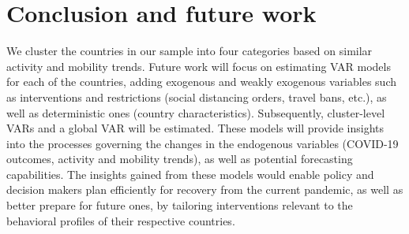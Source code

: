 \documentclass[titlepage,oneside,12pt]{article}
\newcommand{\?}{\stackrel{?}{=}}
\begin{document}
\section{Conclusion and future work}
We cluster the countries in our sample into four categories based on similar activity and mobility trends.
Future work will focus on estimating VAR models for each of the countries, adding exogenous and weakly exogenous variables such as interventions and restrictions (social distancing orders, travel bans, etc.), as well as deterministic ones (country characteristics).
Subsequently, cluster-level VARs and a global VAR will be estimated.
These models will provide insights into the processes governing the changes in the endogenous variables (COVID-19 outcomes, activity and mobility trends), as well as potential forecasting capabilities.
The insights gained from these models would enable policy and decision makers plan efficiently for recovery from the current pandemic, as well as better prepare for future ones, by tailoring interventions relevant to the behavioral profiles of their respective countries.
 




\end{document}
